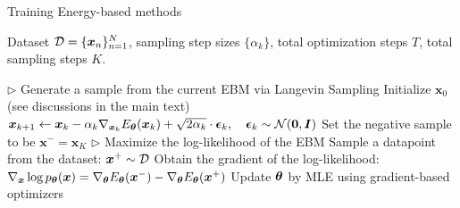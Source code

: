 \begin{algorithm}[t]
\caption{Training Energy-based methods}\label{alg:ebm_training}
\begin{algorithmic}[1]
\Require Dataset $\mathcal{D} = \{ \bm{x}_n \}_{n=1}^N$, sampling step sizes $\{\alpha_k \}$, total optimization steps $T$, total sampling steps $K$.

\vspace{1.5mm}
\State $\triangleright$ Generate a sample from the current EBM via Langevin Sampling
\State Initialize $\bm{x}_0$ (see discussions in the main text)
\State $\bm{x}_{k+1} \gets \bm{x}_k-\alpha_k\nabla_{\bm{x}_k}E_{\bm{\theta}}(\bm{x}_k)+\sqrt{2\alpha_k}\cdot\bm{\epsilon}_k, ~~~\bm{\epsilon}_k\sim\mathcal{N}(\bm{0},\bm{I})$
\EndFor
\State Set the negative sample to be $\bm{x}^{-}=\bm{x}_K$
\vspace{1.5mm}
\State $\triangleright$ Maximize the log-likelihood of the EBM
\State Sample a datapoint from the dataset: $\bm{x}^{+}\sim \mathcal{D}$
\State Obtain the gradient of the log-likelihood: $\nabla_{\bm{x}}\log p_{\bm{\theta}}(\bm{x}) 
    = \nabla_{\bm{\theta}}  E_{\bm{\theta}} (\bm{x}^{-}) - \nabla_{\bm{\theta}}E_{\bm{\theta}} (\bm{x}^{+})$
\State Update $\bm{\theta}$ by MLE using gradient-based optimizers
\EndFor
\end{algorithmic}
\end{algorithm}


